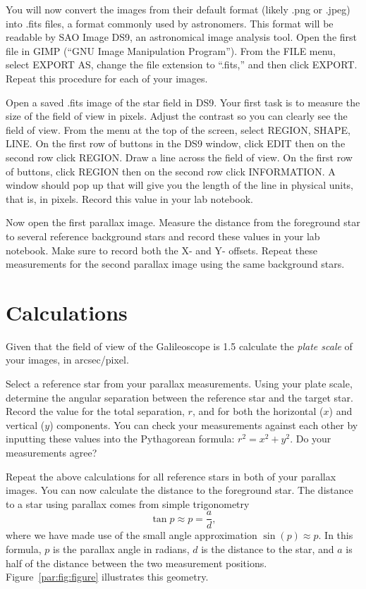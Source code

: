 You will now convert the images from their default format (likely .png or .jpeg) into .fits
files, a format commonly used by astronomers. This format will be readable by SAO
Image DS9, an astronomical image analysis tool. Open the first file in GIMP (“GNU
Image Manipulation Program”). From the FILE menu, select EXPORT AS, change the
file extension to “.fits,” and then click EXPORT. Repeat this procedure for each of your
images.

Open a saved .fits image of the star field in DS9. Your first task is to measure the size of
the field of view in pixels. Adjust the contrast so you can clearly see the field of view.
From the menu at the top of the screen, select REGION, SHAPE, LINE. On the first row
of buttons in the DS9 window, click EDIT then on the second row click REGION. Draw
a line across the field of view. On the first row of buttons, click REGION then on the
second row click INFORMATION. A window should pop up that will give you the length
of the line in physical units, that is, in pixels. Record this value in your lab notebook.

Now open the first parallax image. Measure the distance from the foreground star to
several reference background stars and record these values in your lab notebook. Make
sure to record both the X- and Y- offsets. Repeat these measurements for the second
parallax image using the same background stars.

\section{Calculations}

Given that the field of view of the Galileoscope is 1.5\textdegree
calculate the \textit{plate scale} of your images, in arcsec/pixel.

Select a reference star from your parallax measurements. Using your plate scale,
determine the angular separation between the reference star and the target star. Record
the value for the total separation, $r$, and for both the horizontal ($x$) and vertical ($y$) components. You can
check your measurements against each other by inputting these values into the
Pythagorean formula: $r^2 = x^2 + y^2$. Do your measurements agree?

Repeat the above calculations for all reference stars in both of your parallax images. You
can now calculate the distance to the foreground star. The distance to a star using parallax
comes from simple trigonometry
\begin{equation}
 \tan p \approx p = \frac{a}{d},
\end{equation}
where we have made use of the small angle approximation $\sin(p) \approx p$. In this formula, $p$ is
the parallax angle in radians, $d$ is the distance to the star, and $a$ is half of the distance between the
two measurement positions. Figure~\ref{par:fig:figure} illustrates this geometry.

